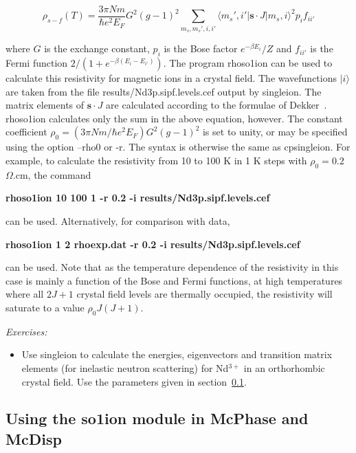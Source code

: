 \begin{enumerate}
\begin{equation} \label{eq:cfres}
\rho_{s-f}(T) = \frac{3\pi N m}{\hbar e^2 E_F} G^2(g-1)^2 \sum_{m_s,m_s',i,i'} 
      \langle m_s',i' | {\mathbf s \cdot J} | m_s, i \rangle^2 p_i f_{ii'}
\end{equation}

\noindent where $G$ is the exchange constant, $p_i$ is the Bose factor $e^{-\beta E_i}/Z$ and $f_{ii'}$ is the
Fermi function $2/(1+e^{-\beta(E_i-E_{i'})})$. The program {\prg rhoso1ion} can be used to calculate this
resistivity for magnetic ions in a crystal field. The wavefunctions $|i\rangle$ are taken from the file {\prg
results/Nd3p.sipf.levels.cef} output by {\prg singleion}. The matrix elements of ${\mathbf s \cdot J}$ are calculated according to
the formulae of Dekker~\cite{dekker}. {\prg rhoso1ion} calculates only the sum in the above equation, however.
The constant coefficient $\rho_0=(3\pi N m/\hbar e^2 E_F) G^2(g-1)^2$ is set to unity, or may be specified using
the option {\prg --rho0} or {\prg -r}. The syntax is otherwise the same as {\prg cpsingleion}. For example, to
calculate the resistivity from 10 to 100 K in 1 K steps with $\rho_0 = 0.2$~$\Omega$.cm, the command 

{\bf rhoso1ion 10 100 1 -r 0.2 -i results/Nd3p.sipf.levels.cef}

 can be used. Alternatively, for comparison with data,

 {\bf rhoso1ion 1 2 rhoexp.dat -r 0.2 -i results/Nd3p.sipf.levels.cef} 

can be used. Note that as the temperature dependence of the resistivity in this case is mainly a
function of the Bose and Fermi functions, at high temperatures where all $2J+1$ crystal field levels are
thermally occupied, the resistivity will saturate to a value $\rho_0 J(J+1)$.

\end{enumerate}

\vspace{1cm}
{\em Exercises:}
\begin{itemize}
\item Use {\prg singleion} to calculate the energies, eigenvectors and
transition matrix elements (for inelastic
neutron scattering) for Nd$^{3+}$ in an orthorhombic crystal field.
Use the parameters given in section~\ref{cf1ion}.
\end{itemize}



\subsection{Using the {\prg so1ion}  module in {\prg McPhase} and {\prg McDisp}}
\label{cf1ion}



